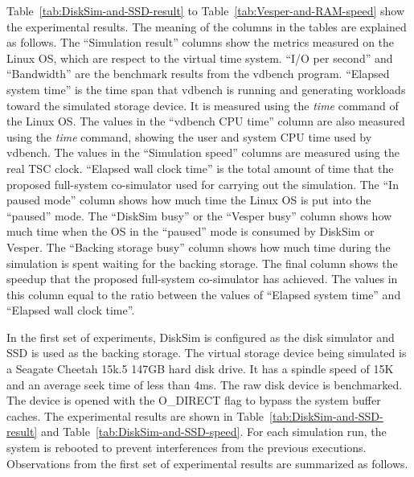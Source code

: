 Table~\ref{tab:DiskSim-and-SSD-result} to Table~\ref{tab:Vesper-and-RAM-speed} show the experimental results. The meaning of the columns in the tables are explained as follows. The ``Simulation result'' columns show the metrics measured on the Linux OS, which are respect to the virtual time system. ``I/O per second'' and ``Bandwidth'' are the benchmark results from the vdbench program. ``Elapsed system time'' is the time span that vdbench is running and generating workloads toward the simulated storage device. It is measured using the \textit{time} command of the Linux OS. The values in the ``vdbench CPU time'' column are also measured using the \textit{time} command, showing the user and system CPU time used by vdbench. The values in the ``Simulation speed'' columns are measured using the real TSC clock. ``Elapsed wall clock time'' is the total amount of time that the proposed full-system co-simulator used for carrying out the simulation. The ``In paused mode'' column shows how much time the Linux OS is put into the ``paused'' mode. The ``DiskSim busy'' or the ``Vesper busy'' column shows how much time when the OS in the ``paused'' mode is consumed by DiskSim or Vesper. The ``Backing storage busy'' column shows how much time during the simulation is spent waiting for the backing storage. The final column shows the speedup that the proposed full-system co-simulator has achieved. The values in this column equal to the ratio between the values of ``Elapsed system time'' and ``Elapsed wall clock time''.

In the first set of experiments, DiskSim is configured as the disk simulator and SSD is used as the backing storage. The virtual storage device being simulated is a Seagate Cheetah 15k.5 147GB hard disk drive. It has a spindle speed of 15K and an average seek time of less than 4\si{\milli\second}. The raw disk device is benchmarked. The device is opened with the O_DIRECT flag to bypass the system buffer caches. The experimental results are shown in Table~\ref{tab:DiskSim-and-SSD-result} and Table~\ref{tab:DiskSim-and-SSD-speed}. For each simulation run, the system is rebooted to prevent interferences from the previous executions. Observations from the first set of experimental results are summarized as follows.

